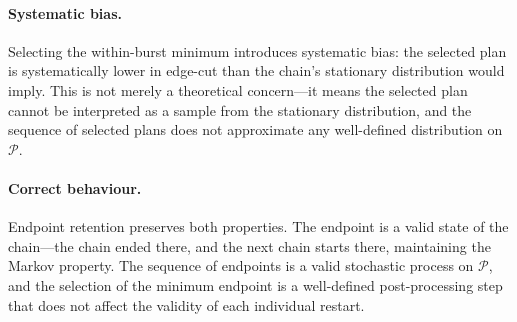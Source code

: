 \paragraph{Systematic bias.}
Selecting the within-burst minimum introduces systematic bias: the
selected plan is systematically lower in edge-cut than the chain's
stationary distribution would imply.
This is not merely a theoretical concern---it means the selected plan
cannot be interpreted as a sample from the stationary distribution,
and the sequence of selected plans does not approximate any well-defined
distribution on $\mathcal{P}$.

\paragraph{Correct behaviour.}
Endpoint retention preserves both properties.
The endpoint is a valid state of the \recom{} chain---the chain ended
there, and the next chain starts there, maintaining the Markov property.
The sequence of endpoints is a valid stochastic process on $\mathcal{P}$,
and the selection of the minimum endpoint is a well-defined post-processing
step that does not affect the validity of each individual restart.

